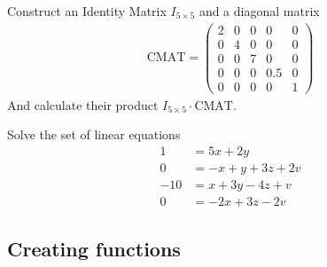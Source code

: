 \begin{ex}
Construct an Identity Matrix $I_{5\times5}$ and a diagonal matrix
\begin{align*}
\textrm{CMAT} = \begin{pmatrix}
2 &0 &0 &0 &0	\\
0 &4 &0 &0 &0	\\
0 &0 &7 &0 &0	\\
0 &0 &0 &0.5 &0	\\
0 &0 &0 &0 &1	
\end{pmatrix}
\end{align*}
And calculate their product $I_{5 \times 5} \cdot \textrm{CMAT}$.
\end{ex}


\begin{ex}
Solve the set of linear equations
\begin{align*}
1	& = 5x + 2y	\\
0	& = -x + y + 3z + 2v	\\
-10 	& = x + 3y - 4z + v	\\
0	& = -2x + 3z - 2v 
\end{align*}
\end{ex}
\known{$\backslash$}




\subsection{Creating functions}



